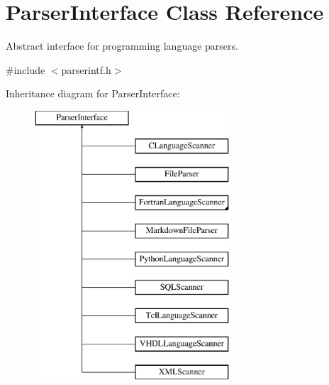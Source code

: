 \hypertarget{class_parser_interface}{}\section{Parser\+Interface Class Reference}
\label{class_parser_interface}


Abstract interface for programming language parsers.  




{\ttfamily \#include $<$parserintf.\+h$>$}

Inheritance diagram for Parser\+Interface\+:\begin{figure}[H]
\begin{center}
\leavevmode
\includegraphics[height=10.000000cm]{class_parser_interface}
\end{center}
\end{figure}

